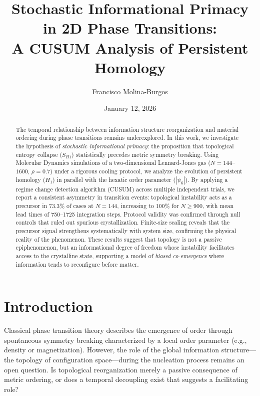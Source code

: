 \documentclass[twocolumn,showpacs,preprintnumbers,amsmath,amssymb,prb,floatfix]{revtex4-2}
\begin{document}
\title{Stochastic Informational Primacy in 2D Phase Transitions:\\
A CUSUM Analysis of Persistent Homology}

\author{Francisco Molina-Burgos}

\date{January 12, 2026}

\begin{abstract}
The temporal relationship between information structure reorganization and material ordering during phase transitions remains underexplored. In this work, we investigate the hypothesis of \textit{stochastic informational primacy}: the proposition that topological entropy collapse ($S_{H1}$) statistically precedes metric symmetry breaking. Using Molecular Dynamics simulations of a two-dimensional Lennard-Jones gas ($N=144$--$1600$, $\rho=0.7$) under a rigorous cooling protocol, we analyze the evolution of persistent homology ($H_1$) in parallel with the hexatic order parameter ($|\psi_6|$). By applying a regime change detection algorithm (CUSUM) across multiple independent trials, we report a consistent asymmetry in transition events: topological instability acts as a precursor in 73.3\% of cases at $N=144$, increasing to 100\% for $N \geq 900$, with mean lead times of 750--1725 integration steps. Protocol validity was confirmed through null controls that ruled out spurious crystallization. Finite-size scaling reveals that the precursor signal strengthens systematically with system size, confirming the physical reality of the phenomenon. These results suggest that topology is not a passive epiphenomenon, but an informational degree of freedom whose instability facilitates access to the crystalline state, supporting a model of \textit{biased co-emergence} where information tends to reconfigure before matter.
\end{abstract}

\maketitle

\section{Introduction}

Classical phase transition theory describes the emergence of order through spontaneous symmetry breaking characterized by a local order parameter (e.g., density or magnetization). However, the role of the global information structure---the topology of configuration space---during the nucleation process remains an open question. Is topological reorganization merely a passive consequence of metric ordering, or does a temporal decoupling exist that suggests a facilitating role?
\end{document}
